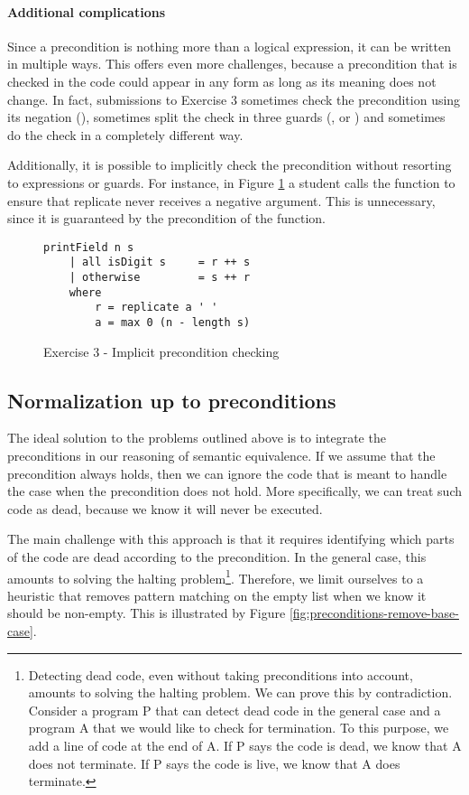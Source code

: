 \paragraph{Additional complications}

Since a precondition is nothing more than a logical expression, it can be written in multiple ways. This offers even more challenges, because a precondition that is checked in the code could appear in any form as long as its meaning does not change. In fact, submissions to Exercise 3 sometimes check the precondition using its negation (), sometimes split the check in three guards (,  or ) and sometimes do the check in a completely different way.

Additionally, it is possible to implicitly check the precondition without resorting to  expressions or guards. For instance, in Figure \ref{fig:ex3-implicit-precondition-checking} a student calls the  function to ensure that replicate never receives a negative argument. This is unnecessary, since it is guaranteed by the precondition of the function.

\begin{figure}
\centering
\begin{verbatim}
printField n s
    | all isDigit s     = r ++ s
    | otherwise         = s ++ r
    where
        r = replicate a ' '
        a = max 0 (n - length s)
\end{verbatim}
\caption{Exercise 3 - Implicit precondition checking}
\label{fig:ex3-implicit-precondition-checking}
\end{figure}

\subsection{Normalization up to preconditions}
\label{sec:analysis-precondition-solution}

The ideal solution to the problems outlined above is to integrate the preconditions in our reasoning of semantic equivalence. If we assume that the precondition always holds, then we can ignore the code that is meant to handle the case when the precondition does not hold. More specifically, we can treat such code as dead, because we know it will never be executed.

The main challenge with this approach is that it requires identifying which parts of the code are dead according to the precondition. In the general case, this amounts to solving the halting problem\footnote{Detecting dead code, even without taking preconditions into account, amounts to solving the halting problem. We can prove this by contradiction. Consider a program P that can detect dead code in the general case and a program A that we would like to check for termination. To this purpose, we add a line of code at the end of A. If P says the code is dead, we know that A does not terminate. If P says the code is live, we know that A does terminate.}. Therefore, we limit ourselves to a heuristic that removes pattern matching on the empty list when we know it should be non-empty. This is illustrated by Figure \ref{fig:preconditions-remove-base-case}.

